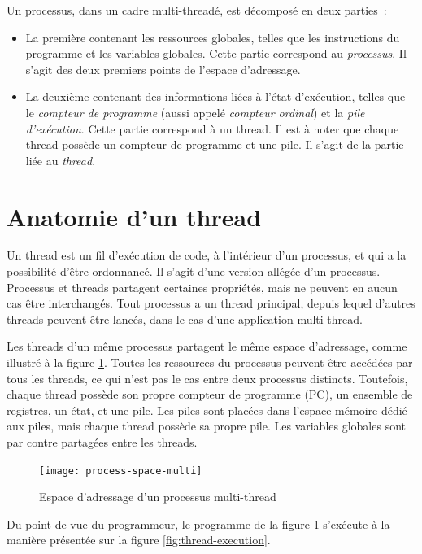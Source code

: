 Un processus, dans un cadre multi-threadé, est décomposé en deux parties~:
\begin{itemize}
\item La première contenant les ressources globales, telles que les instructions du programme et les variables globales. Cette partie correspond au \emph{processus}. Il s'agit des deux premiers points de l'espace d'adressage.
\item La deuxième contenant des informations liées à l'état d'exécution, telles que le \emph{compteur de programme} (aussi appelé \emph{compteur ordinal}) et la \emph{pile d'exécution}. Cette partie correspond à un thread. Il est à noter que chaque thread possède un compteur de programme et une pile. Il s'agit de la partie liée au \emph{thread}.
\end{itemize}

\section{Anatomie d'un thread}

Un thread est un fil d'exécution de code, à l'intérieur d'un processus, et qui a la possibilité d'être ordonnancé. Il s'agit d'une version allégée d'un processus. Processus et threads partagent certaines propriétés, mais ne peuvent en aucun cas être interchangés. Tout processus a un thread principal, depuis lequel d'autres threads peuvent être lancés, dans le cas d'une application multi-thread.

Les threads d'un même processus partagent le même espace d'adressage, comme illustré à la figure \ref{fig:process-space-multi}. Toutes les ressources du processus peuvent être accédées par tous les threads, ce qui n'est pas le cas entre deux processus distincts. Toutefois, chaque thread possède son propre compteur de programme (PC), un ensemble de registres, un état, et une pile. Les piles sont placées dans l'espace mémoire dédié aux piles, mais chaque thread possède sa propre pile. Les variables globales sont par contre partagées entre les threads.

\begin{figure}[!ht]
  \begin{center}
    \texttt{[image: process-space-multi]}
    \caption{\label{fig:process-space-multi}Espace d'adressage d'un processus multi-thread}
  \end{center}
\end{figure}

Du point de vue du programmeur, le programme de la figure \ref{fig:process-space-multi} s'exécute à la manière présentée sur la figure \ref{fig:thread-execution}.

